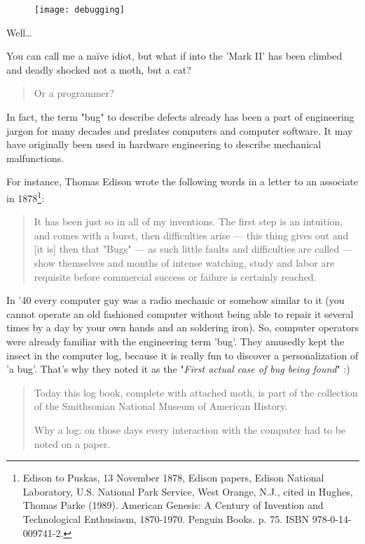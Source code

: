\begin{figure}[!h]
\centering
\texttt{[image: debugging]}
\caption{}
\label{fig:Debugging}
\end{figure}

Well\ldots 

You can call me a naïve idiot, but what if into the 'Mark II' has been climbed and deadly shocked not a moth, but a cat?

\begin{quote}
Or a programmer?
\end{quote}

In fact, the term "bug" to describe defects already has been a part of engineering jargon for many decades and predates computers and computer software. It may have originally been used in hardware engineering to describe mechanical malfunctions. 

For instance, Thomas Edison wrote the following words in a letter to an associate in 1878\footnote{Edison to Puskas, 13 November 1878, Edison papers, Edison National Laboratory, U.S. National Park Service, West Orange, N.J., cited in Hughes, Thomas Parke (1989). American Genesis: A Century of Invention and Technological Enthusiasm, 1870-1970. Penguin Books. p. 75. ISBN 978-0-14-009741-2.}:

\begin{quote}
    It has been just so in all of my inventions. The first step is an intuition, and comes with a burst, then difficulties arise — this thing gives out and [it is] then that "Bugs" — as such little faults and difficulties are called — show themselves and months of intense watching, study and labor are requisite before commercial success or failure is certainly reached.
\end{quote} 

In '40 every computer guy was a radio mechanic or somehow similar to it (you cannot operate an old fashioned computer without being able to repair it several times by a day by your own hands and an soldering iron). So, computer operators were already familiar with the engineering term 'bug'. They amusedly kept the insect in the computer log, because it is really fun to discover a personalization of 'a bug'. That's why they noted it as the "\textit{First actual case of bug being found}" :)

\begin{quote}
Today this log book, complete with attached moth, is part of the collection of the Smithsonian National Museum of American History.

Why a log: on those days every interaction with the computer had to be noted on a paper.                                                                                        \end{quote} 

